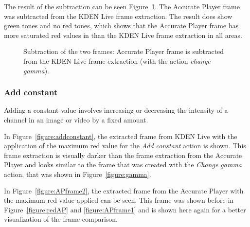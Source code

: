 \documentclass[../MasterThesis.tex]{subfiles}
\begin{document}
The result of the subtraction can be seen Figure~\ref{figure:gammagimp}. The Accurate Player frame was subtracted from the KDEN Live frame extraction. The result does show green tones and no red tones, which shows that the Accurate Player frame has more saturated red values in than the KDEN Live frame extraction in all areas.



\begin{figure}[H]
	\begin{center}
		\caption[Subtraction of KDEN Live (\textit{change gamma}) and Accurate Player.]{Subtraction of the two frames: Accurate Player frame is subtracted from the KDEN Live frame extraction (with the action \textit{change gamma}).}
		\label{figure:gammagimp}
	\end{center}
\end{figure}








\subsubsection*{Add constant}

Adding a constant value involves increasing or decreasing the intensity of a channel in an image or video by a fixed amount. 

In Figure~\ref{figure:addconstant}, the extracted frame from KDEN Live with the application of the maximum red value for the \textit{Add constant} action is shown. This frame extraction is visually darker than the frame extraction from the Accurate Player and looks similar to the frame that was created with the \textit{Change gamma} action, that was shown in Figure~\ref{figure:gamma}.

In Figure~\ref{figure:APframe2}, the extracted frame from the Accurate Player with the maximum red value applied can be seen. This frame was shown before in Figure~\ref{figure:redAP} and \ref{figure:APframe1} and is shown here again for a better visualization of the frame comparison.
\end{document}
